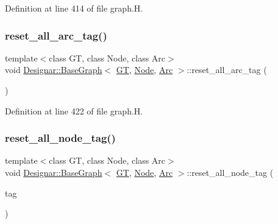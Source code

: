 Definition at line 414 of file graph.\+H.

\mbox{\label{class_designar_1_1_base_graph_af9ae2a4dfd676090de4b4fa04414989c}} 
\subsubsection{\texorpdfstring{reset\+\_\+all\+\_\+arc\+\_\+tag()}{reset\_all\_arc\_tag()}\hspace{0.1cm}{\footnotesize\ttfamily [2/2]}}
{\footnotesize\ttfamily template$<$class GT, class Node, class Arc$>$ \\
void \hyperlink{class_designar_1_1_base_graph}{Designar\+::\+Base\+Graph}$<$ \hyperlink{demo-buildgraph_8_c_a3001c40d2c31ca87ed96cd7d1334a55e}{GT}, \hyperlink{namespace_designar_a5af326c65aa2bd26b26c410f2030d09e}{Node}, \hyperlink{namespace_designar_a3f55fb5513d62ff47cbc8f72b8e95d6f}{Arc} $>$\+::reset\+\_\+all\+\_\+arc\+\_\+tag (\begin{DoxyParamCaption}{ }\end{DoxyParamCaption})\hspace{0.3cm}{\ttfamily [inline]}}



Definition at line 422 of file graph.\+H.

\mbox{\label{class_designar_1_1_base_graph_a07ca1909d77210157b8b9571a4d35d6c}} 
\subsubsection{\texorpdfstring{reset\+\_\+all\+\_\+node\+\_\+tag()}{reset\_all\_node\_tag()}\hspace{0.1cm}{\footnotesize\ttfamily [1/2]}}
{\footnotesize\ttfamily template$<$class GT, class Node, class Arc$>$ \\
void \hyperlink{class_designar_1_1_base_graph}{Designar\+::\+Base\+Graph}$<$ \hyperlink{demo-buildgraph_8_c_a3001c40d2c31ca87ed96cd7d1334a55e}{GT}, \hyperlink{namespace_designar_a5af326c65aa2bd26b26c410f2030d09e}{Node}, \hyperlink{namespace_designar_a3f55fb5513d62ff47cbc8f72b8e95d6f}{Arc} $>$\+::reset\+\_\+all\+\_\+node\+\_\+tag (\begin{DoxyParamCaption}\item[{\hyperlink{namespace_designar_ac91366256ea6ea6ac5fd483d55a7499e}{Graph\+Tag}}]{tag }\end{DoxyParamCaption})\hspace{0.3cm}{\ttfamily [inline]}}



